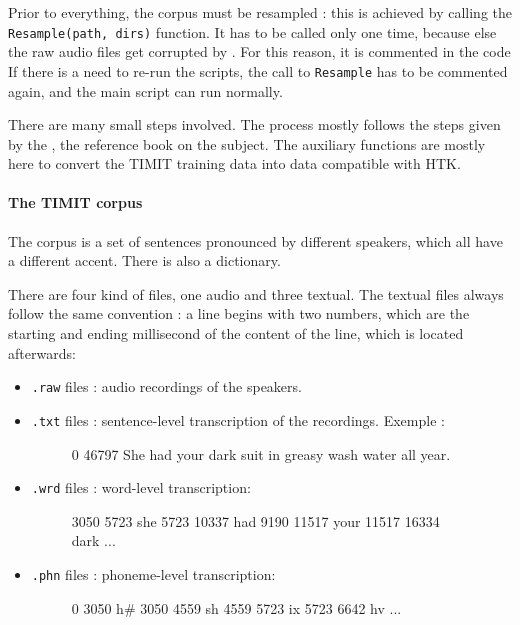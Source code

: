 Prior to everything, the corpus must be resampled : this is achieved by calling the \texttt{Resample(path, dirs)} function. It has to be called only one time, because else the raw audio files get corrupted by . For this reason, it is commented in the code
If there is a need to re-run the scripts, the call to \texttt{Resample} has to be commented again, and the main script can run normally.

There are many small steps involved. The process mostly follows the steps given by the \cite{htkbook}, the reference book on the subject.
The auxiliary functions are mostly here to convert the \ac{TIMIT} training data into data compatible with \ac{HTK}.

\paragraph{The TIMIT corpus}
The corpus is a set of sentences pronounced by different speakers, which all have a different accent. There is also a dictionary.

There are four kind of files, one audio and three textual.
The textual files always follow the same convention : a line begins with two numbers, which are the starting and ending millisecond of the content of the line, which is located afterwards:
\begin{itemize}
\item \texttt{.raw} files : audio recordings of the speakers.
\item \texttt{.txt} files : sentence-level transcription of the recordings. Exemple :
\begin{figure}[h]
\centering
\begin{verbbox} 0 46797 She had your dark suit in greasy wash water all year. \end{verbbox}
\theverbbox
\end{figure}
\item \texttt{.wrd} files : word-level transcription:
\begin{figure}[h]
\centering
\begin{verbbox}3050 5723 she
5723 10337 had
9190 11517 your
11517 16334 dark 
...
\end{verbbox}
\theverbbox
\end{figure}
\item \texttt{.phn} files : phoneme-level transcription:
\begin{figure}[h]
\centering
\begin{verbbox}0 3050 h#
3050 4559 sh
4559 5723 ix
5723 6642 hv 
...
\end{verbbox}
\theverbbox
\end{figure}
\end{itemize}

